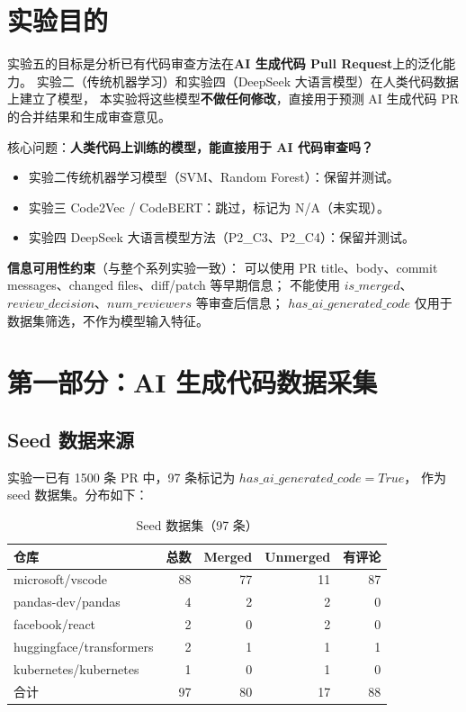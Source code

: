 \documentclass{experimentreport}
\begin{document}
\makereporthead

\section{实验目的}

实验五的目标是分析已有代码审查方法在\textbf{AI 生成代码 Pull Request}上的泛化能力。
实验二（传统机器学习）和实验四（DeepSeek 大语言模型）在人类代码数据上建立了模型，
本实验将这些模型\textbf{不做任何修改}，直接用于预测 AI 生成代码 PR 的合并结果和生成审查意见。

核心问题：\textbf{人类代码上训练的模型，能直接用于 AI 代码审查吗？}

\begin{itemize}
    \item 实验二传统机器学习模型（SVM、Random Forest）：保留并测试。
    \item 实验三 Code2Vec / CodeBERT：跳过，标记为 N/A（未实现）。
    \item 实验四 DeepSeek 大语言模型方法（P2\_C3、P2\_C4）：保留并测试。
\end{itemize}

\textbf{信息可用性约束}（与整个系列实验一致）：
可以使用 PR title、body、commit messages、changed files、diff/patch 等早期信息；
不能使用 $is\_merged$、$review\_decision$、$num\_reviewers$ 等审查后信息；
$has\_ai\_generated\_code$ 仅用于数据集筛选，不作为模型输入特征。

\section{第一部分：AI 生成代码数据采集}

\subsection{Seed 数据来源}

实验一已有 1500 条 PR 中，97 条标记为 $has\_ai\_generated\_code=True$，
作为 seed 数据集。分布如下：

\begin{table}[htbp]
\centering
\caption{Seed 数据集（97 条）}
\begin{tabular}{lrrrr}
\toprule
仓库 & 总数 & Merged & Unmerged & 有评论 \\
\midrule
microsoft/vscode & 88 & 77 & 11 & 87 \\
pandas-dev/pandas & 4 & 2 & 2 & 0 \\
facebook/react & 2 & 0 & 2 & 0 \\
huggingface/transformers & 2 & 1 & 1 & 1 \\
kubernetes/kubernetes & 1 & 0 & 1 & 0 \\
\midrule
合计 & 97 & 80 & 17 & 88 \\
\bottomrule
\end{tabular}
\end{table}
\end{document}
